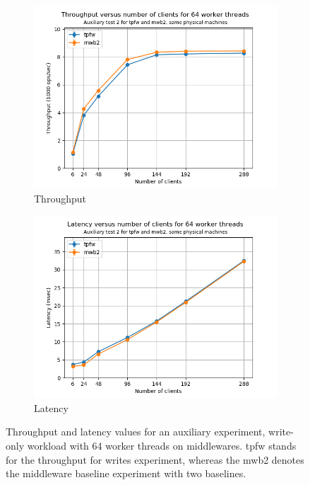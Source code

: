 \documentclass[11pt,a4paper]{article}
\begin{document}
\begin{figure}[h!]
\centering
\begin{subfigure}{.5\textwidth}
  \centering
  \includegraphics[width=1.0\linewidth,trim={5px 0px 10px 0px},clip]{img/plot/auxiliary-2-tp_mw.png}
  \caption{Throughput}
  \label{fig:auxiliary-2-tp_mw}
\end{subfigure}%
\begin{subfigure}{.5\textwidth}
  \centering
  \includegraphics[width=1.0\linewidth,trim={5px 0px 10px 0px},clip]{img/plot/auxiliary-2-lat_mw.png}
  \caption{Latency}
  \label{fig:auxiliary-2-lat_mw}
\end{subfigure}
\caption{Throughput and latency values for an auxiliary experiment, write-only workload with 64 worker threads on middlewares. tpfw stands for the throughput for writes experiment, whereas the mwb2 denotes the middleware baseline experiment with two baselines.}
\label{fig:auxiliary-2_mw}
\end{figure}
\end{document}
